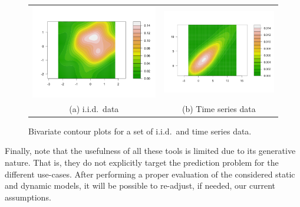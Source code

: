 \begin{itemize}
\begin{figure} [ht!]
\begin{center}
\begin{tabular}{cc}
\includegraphics[scale=0.25]{./figures/PreliminariesBivariateGaussian} &
\includegraphics[scale=0.25]{./figures/PreliminariesBivariateTimeSerie} \\
(a) i.i.d.\ data & (b)  Time series data \\
\end{tabular}
\caption{\label{Figure:PreliminariesBivariates}Bivariate contour plots for a set of i.i.d.\ and time series data. 
}
\end{center}
\end{figure}

\end{itemize}

Finally, note that the usefulness of all these tools is limited due to its generative nature. That is, they do not explicitly target the prediction problem for the different use-cases. After performing a proper evaluation of the considered static and dynamic models, it will be possible to re-adjust, if needed, our current assumptions. 